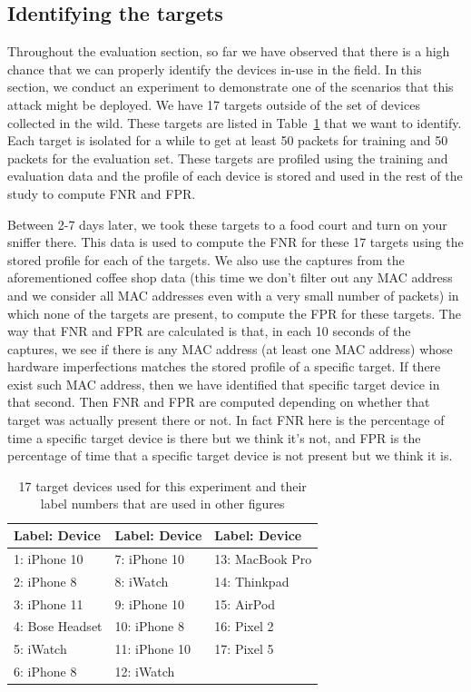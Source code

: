 \subsection{Identifying the targets}
\label{sec:results:case1}
Throughout the evaluation section, so far we have observed that there is a high chance that we can properly identify the devices in-use in the field. In this section, we conduct an experiment to demonstrate one of the scenarios that this attack might be deployed. We have 17 targets outside of the set of devices collected in the wild. These targets are listed in Table~\ref{tab:targets} that we want to identify. Each target is isolated for a while to get at least 50 packets for training and 50 packets for the evaluation set. These targets are profiled using the training and evaluation data and the profile of each device is stored and used in the rest of the study to compute FNR and FPR. 

Between 2-7 days later, we took these targets to a food court and turn on your sniffer there. This data is used to compute the FNR for these 17 targets using the stored profile for each of the targets. We also use the captures from the aforementioned coffee shop data (this time we don't filter out any MAC address and we consider all MAC addresses even with a very small number of packets) in which none of the targets are present, to compute the FPR for these targets. The way that FNR and FPR are calculated is that, in each 10 seconds of the captures, we see if there is any MAC address (at least one MAC address) whose hardware imperfections matches the stored profile of a specific target. If there exist such MAC address, then we have identified that specific target device in that second. Then FNR and FPR are computed depending on whether that target was actually present there or not. In fact FNR here is the percentage of time a specific target device is there but we think it's not, and FPR is the percentage of time that a specific target device is not present but we think it is. 

\begin{table}[]
    \centering
    \begin{tabular}{|l|l|l|}
    \hline
    Label: Device&Label: Device&Label: Device\\ \hline
    1: iPhone 10&7: iPhone 10&13: MacBook Pro\\ \hline
    2: iPhone 8&8: iWatch&14: Thinkpad\\ \hline
    3: iPhone 11&9: iPhone 10&15: AirPod\\ \hline
    4: Bose Headset&10: iPhone 8&16: Pixel 2\\ \hline
    5: iWatch&11: iPhone 10&17: Pixel 5\\ \hline
    6: iPhone 8&12: iWatch& \\ \hline
    \end{tabular}
    \caption{17 target devices used for this experiment and their label numbers that are used in other figures}
    \label{tab:targets}
\end{table}

